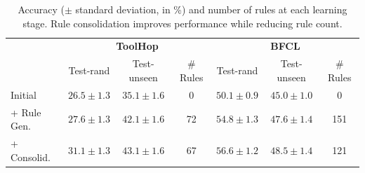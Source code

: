 \begin{table}[t]
\small
\caption{{Accuracy ($\pm$ standard deviation, in \%) and number of rules at each learning stage.} Rule consolidation improves performance while reducing rule count.}
\vspace{0.5em}
\label{tab:learning}
\centering
\renewcommand{\arraystretch}{1.25}
\begin{tabular}{@{}l|ccc|ccc@{}}
\toprule
 & \multicolumn{3}{c|}{\textbf{ToolHop}} & \multicolumn{3}{c}{\textbf{BFCL}} \\
 & Test-rand & Test-unseen & \# Rules & Test-rand & Test-unseen & \# Rules \\
\midrule
Initial
& $26.5 \scriptstyle \pm 1.3$ & $35.1 \scriptstyle \pm 1.6$ & 0
& $50.1 \scriptstyle \pm 0.9$ & $45.0 \scriptstyle \pm 1.0$ & 0 \\
+ Rule Gen.
& $27.6 \scriptstyle \pm 1.3$ & $42.1 \scriptstyle \pm 1.6$ & 72
& $54.8 \scriptstyle \pm 1.3$ & $47.6 \scriptstyle \pm 1.4$ & 151 \\
+ Consolid.
& $\mathbf{31.1} \scriptstyle \pm 1.3$ & $\mathbf{43.1} \scriptstyle \pm 1.6$ & 67
& $\mathbf{56.6} \scriptstyle \pm 1.2$ & $\mathbf{48.5} \scriptstyle \pm 1.4$ & 121
\\
\bottomrule
\end{tabular}
\end{table}
